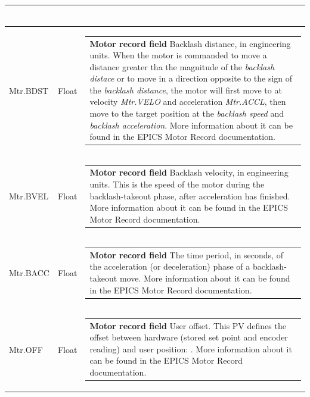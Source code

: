 \documentclass[openany]{article}
\begin{document}
\begin{longtable}{| m{4.5cm} m{2.5cm}  m{8.5cm} |}
\begin{tabular}{@{}m{6cm}@{}}
            \end{tabular} \hypertarget{pv:mtr-bdst}{}\\ \hline
        Mtr.BDST & Float & \begin{tabular}{@{}m{6cm}@{}}
                \textbf{\color{ForestGreen} Motor record field} Backlash distance, in engineering units. When the motor is commanded to move a distance greater tha  the magnitude of the \emph{backlash distace} or to move in a direction opposite to the sign of the \emph{backlash distance}, the motor will first move to $target - backlash$ at velocity \emph{Mtr.VELO} and acceleration \emph{Mtr.ACCL}, then move to the target position at the \emph{backlash speed} and \emph{backlash acceleration}. More information about it can be found in the EPICS Motor Record documentation.
            \end{tabular} \hypertarget{pv:mtr-bvel}{}\\ \hline
        Mtr.BVEL & Float & \begin{tabular}{@{}m{6cm}@{}}
                \textbf{\color{ForestGreen} Motor record field} Backlash velocity, in engineering units. This is the speed of the motor during the backlash-takeout phase, after acceleration has finished. More information about it can be found in the EPICS Motor Record documentation.
            \end{tabular} \hypertarget{pv:mtr-bacc}{}\\ \hline
        Mtr.BACC & Float & \begin{tabular}{@{}m{6cm}@{}}
                \textbf{\color{ForestGreen} Motor record field} The time period, in seconds, of the acceleration (or deceleration) phase of a backlash-takeout move. More information about it can be found in the EPICS Motor Record documentation.
            \end{tabular} \hypertarget{pv:mtr-off}{}\\ \hline
        Mtr.OFF & Float & \begin{tabular}{@{}m{6cm}@{}}
                \textbf{\color{ForestGreen} Motor record field} User offset. This PV defines the offset between hardware (stored set point and encoder reading) and user position: $userPos = Mtr.DIR * HwdPos + Offset$. More information about it can be found in the EPICS Motor Record documentation.
            \end{tabular} \hypertarget{pv:mtr-ntm}{}\\ \hline

\end{longtable}
\end{document}
